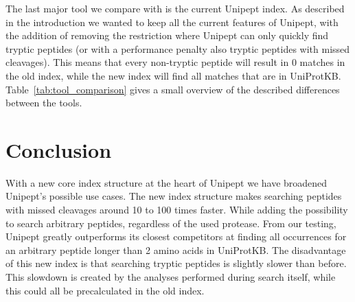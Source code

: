 \documentclass[11pt]{article}
\newenvironment{Table}
{\par\medskip\noindent\minipage{\linewidth}}
{\endminipage\par\medskip}
\begin{document}
\begin{multicols}{2}
        The last major tool we compare with is the current Unipept index.
        As described in the introduction we wanted to keep all the current features of Unipept, with the addition of removing the restriction where Unipept can only quickly find tryptic peptides (or with a performance penalty also tryptic peptides with missed cleavages).
        This means that every non-tryptic peptide will result in 0 matches in the old index, while the new index will find all matches that are in UniProtKB\@.
        Table~\ref{tab:tool_comparison} gives a small overview of the described differences between the tools.

        \begin{Table}
            \centering
            \label{tab:tool_comparison}
        \end{Table}

        \section{Conclusion}\label{sec:discussion}
        With a new core index structure at the heart of Unipept we have broadened Unipept's possible use cases.
        The new index structure makes searching peptides with missed cleavages around 10 to 100 times faster.
        While adding the possibility to search arbitrary peptides, regardless of the used protease.
        From our testing, Unipept greatly outperforms its closest competitors at finding all occurrences for an arbitrary peptide longer than 2 amino acids in UniProtKB\@.
        The disadvantage of this new index is that searching tryptic peptides is slightly slower than before.
        This slowdown is created by the analyses performed during search itself, while this could all be precalculated in the old index.


\end{multicols}
\end{document}
